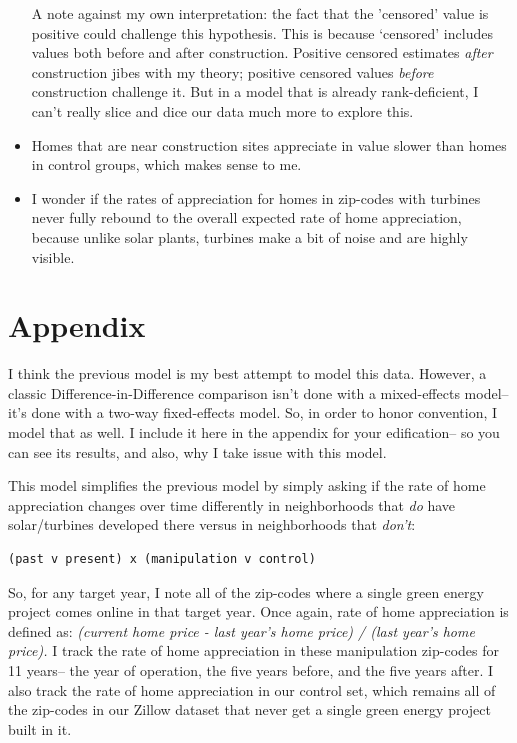 \documentclass{article}
\begin{document}
\begin{itemize}
A note against my own interpretation: the fact that the 'censored' value is positive could challenge this hypothesis. This is because `censored' includes values both before and after construction. Positive censored estimates \emph{after} construction jibes with my theory; positive censored values \emph{before} construction challenge it. But in a model that is already rank-deficient, I can't really slice and dice our data much more to explore this.
\item Homes that are near construction sites appreciate in value slower than homes in control groups, which makes sense to me.
\item I wonder if the rates of appreciation for homes in zip-codes with turbines never fully rebound to the overall expected rate of home appreciation, because unlike solar plants, turbines make a bit of noise and are highly visible.
\end{itemize}


\section{Appendix}

I think the previous model is my best attempt to model this data.
However, a classic Difference-in-Difference comparison isn't done with a mixed-effects model-- it's done with a two-way fixed-effects model.
So, in order to honor convention, I model that as well.
I include it here in the appendix for your edification-- so you can see its results, and also, why I take issue with this model.

This model simplifies the previous model by simply asking if the rate of home appreciation changes over time differently in neighborhoods that \emph{do} have solar/turbines developed there versus in neighborhoods that \emph{don't}:
\begin{verbatim}
(past v present) x (manipulation v control)
\end{verbatim}

So, for any target year, I note all of the zip-codes where a single green energy project comes online in that target year.
Once again, rate of home appreciation is defined as:
\noindent\textit{(current home price - last year's home price) / (last year's home price). }
I track the rate of home appreciation in these manipulation zip-codes for 11 years-- the year of operation, the five years before, and the five years after.
I also track the rate of home appreciation in our control set, which remains all of the zip-codes in our Zillow dataset that never get a single green energy project built in it.
\end{document}
